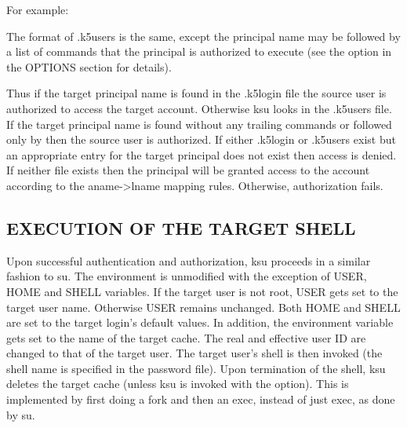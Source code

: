 \documentclass[letterpaper,10pt,english]{sphinxmanual}
\begin{document}
For example:

%
\begin{sphinxVerbatim}[commandchars=\\\{\}]
\end{sphinxVerbatim}

The format of .k5users is the same, except the principal name may be
followed by a list of commands that the principal is authorized to
execute (see the  option in the OPTIONS section for details).

Thus if the target principal name is found in the .k5login file the
source user is authorized to access the target account.  Otherwise ksu
looks in the .k5users file.  If the target principal name is found
without any trailing commands or followed only by \sphinxcode{*} then the
source user is authorized.  If either .k5login or .k5users exist but
an appropriate entry for the target principal does not exist then
access is denied.  If neither file exists then the principal will be
granted access to the account according to the aname-\textgreater{}lname mapping
rules.  Otherwise, authorization fails.


\subsection{EXECUTION OF THE TARGET SHELL}
\label{\detokenize{user/user_commands/ksu:execution-of-the-target-shell}}
Upon successful authentication and authorization, ksu proceeds in a
similar fashion to su.  The environment is unmodified with the
exception of USER, HOME and SHELL variables.  If the target user is
not root, USER gets set to the target user name.  Otherwise USER
remains unchanged.  Both HOME and SHELL are set to the target login’s
default values.  In addition, the environment variable 
gets set to the name of the target cache.  The real and effective user
ID are changed to that of the target user.  The target user’s shell is
then invoked (the shell name is specified in the password file).  Upon
termination of the shell, ksu deletes the target cache (unless ksu is
invoked with the  option).  This is implemented by first doing a
fork and then an exec, instead of just exec, as done by su.
\end{document}
